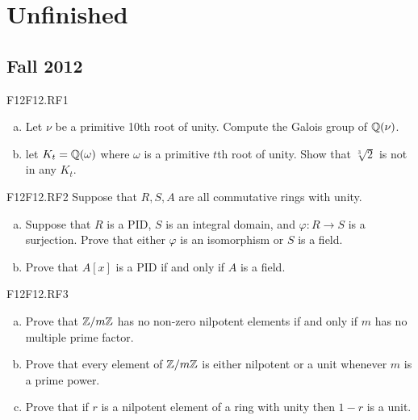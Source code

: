 \documentclass[../AlgebraQualSolutions.tex]{subfiles}
\begin{document}
\section{Unfinished}


	\subsection{Fall 2012}
	
	\begin{prob}{F12}{F12.RF1}
	\begin{enumerate}[(a)]
	\item Let $\nu$ be a primitive 10th root of unity. Compute the Galois group of $\mathbb{Q}(\nu)$.
	\item let $K_t = \mathbb{Q}(\omega)$ where $\omega$ is a primitive $t$th root of unity. Show that $\sqrt[3]{2}$ is not in any $K_t$.
	\end{enumerate}
	\end{prob}
	
	\begin{prob}{F12}{F12.RF2}
	Suppose that $R,S,A$ are all commutative rings with unity.
	\begin{enumerate}[(a)]
	\item Suppose that $R$ is a PID, $S$ is an integral domain, and $\varphi:R \to S$ is a surjection. Prove that either $\varphi$ is an isomorphism or $S$ is a field.
	\item Prove that $A[x]$ is a PID if and only if $A$ is a field.
	\end{enumerate}
	\end{prob}
	
	\begin{prob}{F12}{F12.RF3}
	\begin{enumerate}[(a)]
	\item Prove that $\mathbb{Z}/m\mathbb{Z}$ has no non-zero nilpotent elements if and only if $m$ has no multiple prime factor.
	\item Prove that every element of $\mathbb{Z}/m\mathbb{Z}$ is either nilpotent or a unit whenever $m$ is a prime power.
	\item Prove that if $r$ is a nilpotent element of a ring with unity then $1-r$ is a unit.
	\end{enumerate}
	\end{prob}
\end{document}
